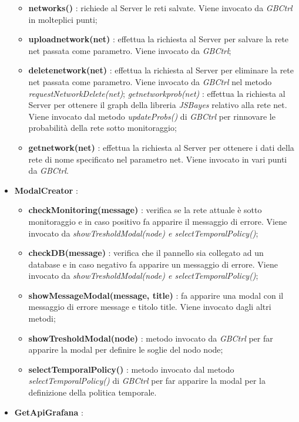 \begin{itemize}
\begin{itemize}
				\item \textbf{networks()} : richiede al Server le reti salvate. Viene invocato da \textit{GBCtrl} in molteplici punti;
				\item \textbf{uploadnetwork(net)} : effettua la richiesta al Server per salvare la rete net passata come parametro. Viene invocato da \textit{GBCtrl};
				\item \textbf{deletenetwork(net)} : effettua la richiesta al Server per eliminare la rete net passata come parametro. Viene invocato da \textit{GBCtrl} nel metodo \textit{requestNetworkDelete(net)};
				\textit{getnetworkprob(net)} : effettua la richiesta al Server per ottenere il graph della libreria \textit{JSBayes} relativo alla rete net. Viene invocato dal metodo \textit{updateProbs()} di \textit{GBCtrl} per rinnovare le probabilità della rete sotto monitoraggio;
				\item \textbf{getnetwork(net)} : effettua la richiesta al Server per ottenere i dati della rete di nome specificato nel parametro net. Viene invocato in vari punti da \textit{GBCtrl}.
			\end{itemize}
			\item \textbf{ModalCreator} :
			\begin{itemize}
				\item \textbf{checkMonitoring(message)} : verifica se la rete attuale è sotto monitoraggio e in caso positivo fa apparire il messaggio di errore. Viene invocato da \textit{showTresholdModal(node) e selectTemporalPolicy()};
				\item \textbf{checkDB(message)} : verifica che il pannello sia collegato ad un database e in caso negativo fa apparire un messaggio di errore. Viene invocato da \textit{showTresholdModal(node) e selectTemporalPolicy()};
				\item \textbf{showMessageModal(message, title)} : fa apparire una modal con il messaggio di errore message e titolo title. Viene invocato dagli altri metodi;
				\item \textbf{showTresholdModal(node)} : metodo invocato da \textit{GBCtrl} per far apparire la modal per definire le soglie del nodo node;
				\item \textbf{selectTemporalPolicy()} : metodo invocato dal metodo \textit{selectTemporalPolicy()} di \textit{GBCtrl} per far apparire la modal per la definizione della politica temporale.
			\end{itemize}
			\item \textbf{GetApiGrafana} :
			\begin{itemize}

\end{itemize}
\end{itemize}
